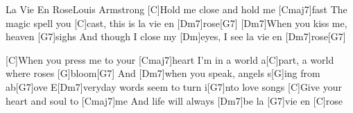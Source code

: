 \documentclass[../main.tex]{subfiles}
\begin{document}
\begin{song}{La Vie En Rose}{Louis Armstrong}{}
[C]Hold me close and hold me [Cmaj7]fast
The magic spell you [C]cast, this is la vie en [Dm7]rose[G7]{\hh}
[Dm7]When you kiss me, heaven [G7]sighs
And though I close my [Dm]eyes, I see la vie en [Dm7]rose[G7]{\hh}

[C]When you press me to your [Cmaj7]heart
I'm in a world a[C]part, a world where roses [G]bloom[G7]{\hh}
And [Dm7]when you speak, angels s[G]ing from ab[G7]ove
E[Dm7]veryday words seem to turn i[G7]nto love songs
[C]Give your heart and soul to [Cmaj7]me
And life will always [Dm7]be la [G7]vie en [C]rose
\end{song}
\end{document}
